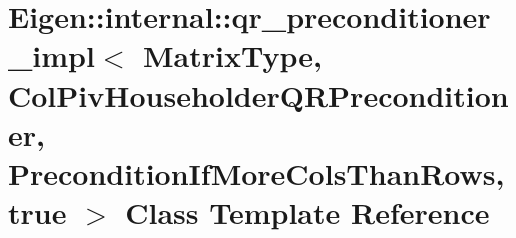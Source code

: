 \hypertarget{class_eigen_1_1internal_1_1qr__preconditioner__impl_3_01_matrix_type_00_01_col_piv_householder_q9febbd0c27c13f65b619ca11d9f35cb8}{}\section{Eigen\+:\+:internal\+:\+:qr\+\_\+preconditioner\+\_\+impl$<$ Matrix\+Type, Col\+Piv\+Householder\+Q\+R\+Preconditioner, Precondition\+If\+More\+Cols\+Than\+Rows, true $>$ Class Template Reference}
\label{class_eigen_1_1internal_1_1qr__preconditioner__impl_3_01_matrix_type_00_01_col_piv_householder_q9febbd0c27c13f65b619ca11d9f35cb8}
